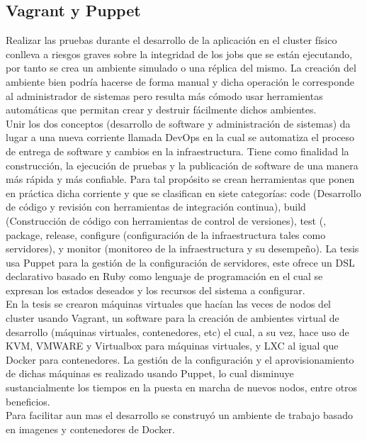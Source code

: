 \subsection{Vagrant y Puppet}
Realizar las pruebas durante el desarrollo de la aplicación en el cluster físico conlleva a riesgos graves sobre la integridad de los jobs que se están ejecutando, por tanto se crea un ambiente simulado o una réplica del mismo. La creación del ambiente bien podría hacerse de forma manual y dicha operación le corresponde al administrador de sistemas pero resulta más cómodo usar herramientas automáticas que permitan crear y destruir fácilmente dichos ambientes. \\

Unir los dos conceptos (desarrollo de software y administración de sistemas) da lugar a una nueva corriente llamada DevOps en la cual se automatiza el proceso de entrega de software y cambios en la infraestructura. Tiene como finalidad la construcción, la ejecución de pruebas y la publicación de software de una manera más rápida y más confiable. Para tal propósito se crean herramientas que ponen en práctica dicha corriente y que se clasifican en siete categorías: code (Desarrollo de código y revisión con herramientas de integración continua), build (Construcción de código con herramientas de control de versiones), test (, package, release, configure (configuración de la infraestructura tales como servidores), y monitor (monitoreo de la infraestructura y su desempeño). La tesis usa Puppet para la gestión de la configuración de servidores, este ofrece un DSL declarativo basado en Ruby como lenguaje de programación en el cual se expresan los estados deseados y los recursos del sistema a configurar. \\

En la tesis se crearon máquinas virtuales que hacían las veces de nodos del cluster usando Vagrant, un software para la creación de ambientes virtual de desarrollo (máquinas virtuales, contenedores, etc) el cual, a su vez, hace uso de KVM, VMWARE y Virtualbox para máquinas virtuales, y LXC al igual que Docker para contenedores. La gestión de la configuración y el aprovisionamiento de dichas máquinas es realizado usando Puppet, lo cual disminuye sustancialmente los tiempos en la puesta en marcha de nuevos nodos, entre otros beneficios. \\

Para facilitar aun mas el desarrollo se construyó un ambiente de trabajo basado en imagenes y contenedores de Docker.


